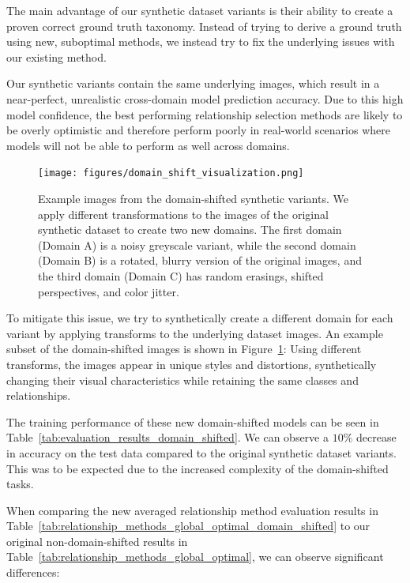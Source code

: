 The main advantage of our synthetic dataset variants is their ability to create a proven correct ground truth taxonomy.
Instead of trying to derive a ground truth using new, suboptimal methods,
we instead try to fix the underlying issues with our existing method.

Our synthetic variants contain the same underlying images,
which result in a near-perfect, unrealistic cross-domain model prediction accuracy.
Due to this high model confidence, the best performing relationship selection methods are likely to be overly optimistic
and therefore perform poorly in real-world scenarios where models will not be able to perform as well across domains.

\begin{figure}[H]
      \centering
      \texttt{[image: figures/domain\_shift\_visualization.png]}

      \caption{Example images from the domain-shifted synthetic variants.
            We apply different transformations to the images of the original synthetic dataset
            to create two new domains. The first domain (Domain A) is a noisy greyscale variant,
            while the second domain (Domain B) is a rotated, blurry version of the original images,
            and the third domain (Domain C) has random erasings, shifted perspectives, and color jitter.}
      \label{fig:domain_shift}
\end{figure}

To mitigate this issue, we try to synthetically create a different domain for each variant by applying transforms to the
underlying dataset images.
An example subset of the domain-shifted images is shown in Figure~\ref{fig:domain_shift}:
Using different transforms, the images appear in unique styles and distortions,
synthetically changing their visual characteristics
while retaining the same classes and relationships.



The training performance of these new domain-shifted models can be seen in Table~\ref{tab:evaluation_results_domain_shifted}.
We can observe a $10\%$ decrease in accuracy on the test data compared to the original synthetic dataset variants.
This was to be expected due to the increased complexity of the domain-shifted tasks.



When comparing the new averaged relationship method evaluation results in Table~\ref{tab:relationship_methods_global_optimal_domain_shifted}
to our original non-domain-shifted results in Table~\ref{tab:relationship_methods_global_optimal},
we can observe significant differences:

